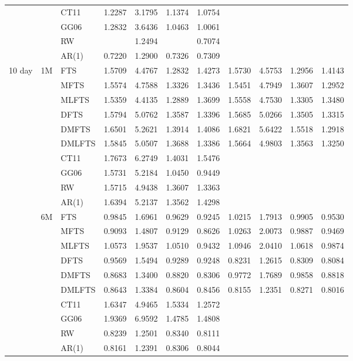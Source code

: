 \documentclass[12pt,a4paper]{article}
\def\textBF#1{\sbox\CBox{#1}\resizebox{\wd\CBox}{\ht\CBox}{\textbf{#1}}}
\begin{document}
\begin{center}
\begin{small}
\begin{longtable}{@{}lllcccccccc@{}}
 & & CT11 & 1.2287 & 3.1795 & 1.1374 & 1.0754 \\
 & & GG06 & 1.2832 & 3.6436 & 1.0463 & 1.0061 \\
 & & RW & \textBF{0.6934} & 1.2494 & \textBF{0.7137} & 0.7074 \\
 & & AR(1) & 0.7220 & 1.2900 & 0.7326 & 0.7309 \\
\midrule  
  10 day & 1M & FTS & 1.5709 & 4.4767 & 1.2832 & 1.4273 & 1.5730 & 4.5753 & 1.2956 & 1.4143 \\
& & MFTS & 1.5574 & 4.7588 & 1.3326 & 1.3436 & 1.5451 & 4.7949 & 1.3607 & 1.2952 \\
& & MLFTS & 1.5359 & 4.4135 & 1.2889 & 1.3699 & 1.5558 & 4.7530 & 1.3305 & 1.3480 \\
& & DFTS & 1.5794 & 5.0762 & 1.3587 & 1.3396 & 1.5685 & 5.0266 & 1.3505 & 1.3315 \\
& & DMFTS & 1.6501 & 5.2621 & 1.3914 & 1.4086 & 1.6821 & 5.6422 & 1.5518 & 1.2918 \\
& & DMLFTS & 1.5845 & 5.0507 & 1.3688 & 1.3386 & 1.5664 & 4.9803 & 1.3563 & 1.3250 \\
& & CT11 & 1.7673 & 6.2749 & 1.4031 & 1.5476 \\
& & GG06 & 1.5731 & 5.2184 & 1.0450 & 0.9449 \\
& & RW & 1.5715 & 4.9438 & 1.3607 & 1.3363 \\
& & AR(1) & 1.6394 & 5.2137 & 1.3562 & 1.4298 \\
  \cmidrule{2-11}
  & 6M & FTS & 0.9845 & 1.6961 & 0.9629 & 0.9245 & 1.0215 & 1.7913 & 0.9905 & 0.9530 \\
& & MFTS & 0.9093 & 1.4807 & 0.9129 & 0.8626 & 1.0263 & 2.0073 & 0.9887 & 0.9469 \\
& & MLFTS & 1.0573 & 1.9537 & 1.0510 & 0.9432 & 1.0946 & 2.0410 & 1.0618 & 0.9874 \\
& & DFTS & 0.9569 & 1.5494 & 0.9289 & 0.9248 & 0.8231 & 1.2615 & 0.8309 & 0.8084 \\
& & DMFTS & 0.8683 & 1.3400 & 0.8820 & 0.8306 & 0.9772 & 1.7689 & 0.9858 & 0.8818 \\
& & DMLFTS & 0.8643 & 1.3384 & 0.8604 & 0.8456 & 0.8155 & 1.2351 & 0.8271 & 0.8016 \\
& & CT11 & 1.6347 & 4.9465 & 1.5334 & 1.2572 \\
& & GG06 & 1.9369 & 6.9592 & 1.4785 & 1.4808 \\
& & RW & 0.8239 & 1.2501 & 0.8340 & 0.8111 \\
& & AR(1) & 0.8161 & 1.2391 & 0.8306 & 0.8044 \\

\end{longtable}
\end{small}
\end{center}
\end{document}
